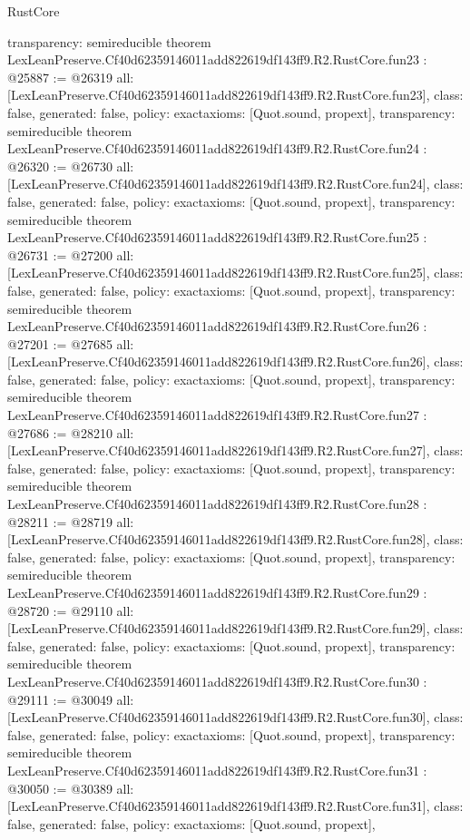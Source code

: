 \begin{lexlean}{RustCore}
\begin{coremodule}
{  transparency: semireducible
}
theorem LexLeanPreserve.Cf40d62359146011add822619df143ff9.R2.RustCore.fun23 : @25887 := @26319 {
  all: [LexLeanPreserve.Cf40d62359146011add822619df143ff9.R2.RustCore.fun23],
  class: false,
  generated: false,
  policy: exact{axioms: [Quot.sound, propext]},
  transparency: semireducible
}
theorem LexLeanPreserve.Cf40d62359146011add822619df143ff9.R2.RustCore.fun24 : @26320 := @26730 {
  all: [LexLeanPreserve.Cf40d62359146011add822619df143ff9.R2.RustCore.fun24],
  class: false,
  generated: false,
  policy: exact{axioms: [Quot.sound, propext]},
  transparency: semireducible
}
theorem LexLeanPreserve.Cf40d62359146011add822619df143ff9.R2.RustCore.fun25 : @26731 := @27200 {
  all: [LexLeanPreserve.Cf40d62359146011add822619df143ff9.R2.RustCore.fun25],
  class: false,
  generated: false,
  policy: exact{axioms: [Quot.sound, propext]},
  transparency: semireducible
}
theorem LexLeanPreserve.Cf40d62359146011add822619df143ff9.R2.RustCore.fun26 : @27201 := @27685 {
  all: [LexLeanPreserve.Cf40d62359146011add822619df143ff9.R2.RustCore.fun26],
  class: false,
  generated: false,
  policy: exact{axioms: [Quot.sound, propext]},
  transparency: semireducible
}
theorem LexLeanPreserve.Cf40d62359146011add822619df143ff9.R2.RustCore.fun27 : @27686 := @28210 {
  all: [LexLeanPreserve.Cf40d62359146011add822619df143ff9.R2.RustCore.fun27],
  class: false,
  generated: false,
  policy: exact{axioms: [Quot.sound, propext]},
  transparency: semireducible
}
theorem LexLeanPreserve.Cf40d62359146011add822619df143ff9.R2.RustCore.fun28 : @28211 := @28719 {
  all: [LexLeanPreserve.Cf40d62359146011add822619df143ff9.R2.RustCore.fun28],
  class: false,
  generated: false,
  policy: exact{axioms: [Quot.sound, propext]},
  transparency: semireducible
}
theorem LexLeanPreserve.Cf40d62359146011add822619df143ff9.R2.RustCore.fun29 : @28720 := @29110 {
  all: [LexLeanPreserve.Cf40d62359146011add822619df143ff9.R2.RustCore.fun29],
  class: false,
  generated: false,
  policy: exact{axioms: [Quot.sound, propext]},
  transparency: semireducible
}
theorem LexLeanPreserve.Cf40d62359146011add822619df143ff9.R2.RustCore.fun30 : @29111 := @30049 {
  all: [LexLeanPreserve.Cf40d62359146011add822619df143ff9.R2.RustCore.fun30],
  class: false,
  generated: false,
  policy: exact{axioms: [Quot.sound, propext]},
  transparency: semireducible
}
theorem LexLeanPreserve.Cf40d62359146011add822619df143ff9.R2.RustCore.fun31 : @30050 := @30389 {
  all: [LexLeanPreserve.Cf40d62359146011add822619df143ff9.R2.RustCore.fun31],
  class: false,
  generated: false,
  policy: exact{axioms: [Quot.sound, propext]},
}
\end{coremodule}
\end{lexlean}
